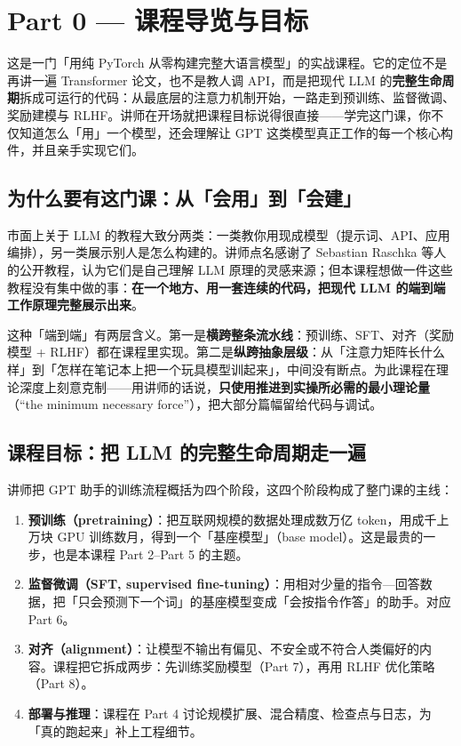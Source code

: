 ﻿\section{Part 0 — 课程导览与目标}

这是一门「用纯 PyTorch 从零构建完整大语言模型」的实战课程。它的定位不是再讲一遍 Transformer 论文，也不是教人调 API，而是把现代 LLM 的\textbf{完整生命周期}拆成可运行的代码：从最底层的注意力机制开始，一路走到预训练、监督微调、奖励建模与 RLHF。讲师在开场就把课程目标说得很直接——学完这门课，你不仅知道怎么「用」一个模型，还会理解让 GPT 这类模型真正工作的每一个核心构件，并且亲手实现它们。

\subsection{为什么要有这门课：从「会用」到「会建」}

市面上关于 LLM 的教程大致分两类：一类教你用现成模型（提示词、API、应用编排），另一类展示别人是怎么构建的。讲师点名感谢了 Sebastian Raschka 等人的公开教程，认为它们是自己理解 LLM 原理的灵感来源；但本课程想做一件这些教程没有集中做的事：\textbf{在一个地方、用一套连续的代码，把现代 LLM 的端到端工作原理完整展示出来}。

这种「端到端」有两层含义。第一是\textbf{横跨整条流水线}：预训练、SFT、对齐（奖励模型 + RLHF）都在课程里实现。第二是\textbf{纵跨抽象层级}：从「注意力矩阵长什么样」到「怎样在笔记本上把一个玩具模型训起来」，中间没有断点。为此课程在理论深度上刻意克制——用讲师的话说，\textbf{只使用推进到实操所必需的最小理论量}（``the minimum necessary force''），把大部分篇幅留给代码与调试。

\subsection{课程目标：把 LLM 的完整生命周期走一遍}

讲师把 GPT 助手的训练流程概括为四个阶段，这四个阶段构成了整门课的主线：

\begin{enumerate}
\item \textbf{预训练（pretraining）}：把互联网规模的数据处理成数万亿 token，用成千上万块 GPU 训练数月，得到一个「基座模型」（base model）。这是最贵的一步，也是本课程 Part 2--Part 5 的主题。
\item \textbf{监督微调（SFT, supervised fine-tuning）}：用相对少量的指令—回答数据，把「只会预测下一个词」的基座模型变成「会按指令作答」的助手。对应 Part 6。
\item \textbf{对齐（alignment）}：让模型不输出有偏见、不安全或不符合人类偏好的内容。课程把它拆成两步：先训练奖励模型（Part 7），再用 RLHF 优化策略（Part 8）。
\item \textbf{部署与推理}：课程在 Part 4 讨论规模扩展、混合精度、检查点与日志，为「真的跑起来」补上工程细节。
\end{enumerate}

